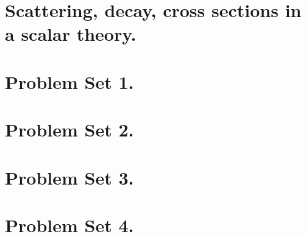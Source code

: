    \chapter{Scattering, decay, cross sections in a scalar theory.}
      

   \chapter{Problem Set 1.}

      
      
      
      
      

   \chapter{Problem Set 2.}

      
      
      
      

%
{%
\relax%
}%
{%
   \chapter{Problem Set 3.}

      
      
      
      

   \chapter{Problem Set 4.}

      
      
      
      
%
}%

